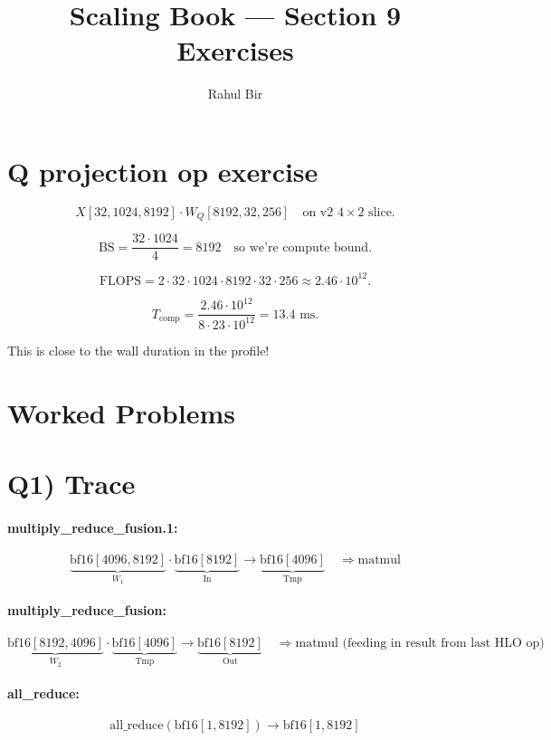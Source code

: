\documentclass[11pt]{article}
\title{Scaling Book --- Section 9 Exercises}
\author{Rahul Bir}
\date{}
\begin{document}
\maketitle

\section*{Q projection op exercise}

\[
X[32, 1024, 8192] \cdot W_Q[8192, 32, 256] \quad \text{on v2 } 4 \times 2 \text{ slice.}
\]

\[
\text{BS} = \frac{32 \cdot 1024}{4} = 8192 \quad \text{so we're compute bound.}
\]

\[
\text{FLOPS} = 2 \cdot 32 \cdot 1024 \cdot 8192 \cdot 32 \cdot 256 \approx 2.46 \cdot 10^{12}.
\]

\[
T_{\text{comp}} = \frac{2.46 \cdot 10^{12}}{8 \cdot 23 \cdot 10^{12}} = 13.4 \text{ ms.}
\]

This is close to the wall duration in the profile!

\section*{Worked Problems}

\section*{Q1) Trace}

\paragraph{multiply\_reduce\_fusion.1:}
\[
\underbrace{\text{bf16}[4096, 8192]}_{W_1} \cdot \underbrace{\text{bf16}[8192]}_{\text{In}} \to \underbrace{\text{bf16}[4096]}_{\text{Tmp}} \quad \Rightarrow \text{matmul}
\]

\paragraph{multiply\_reduce\_fusion:}
\[
\underbrace{\text{bf16}[8192, 4096]}_{W_2} \cdot \underbrace{\text{bf16}[4096]}_{\text{Tmp}} \to \underbrace{\text{bf16}[8192]}_{\text{Out}} \quad \Rightarrow \text{matmul (feeding in result from last HLO op)}
\]

\paragraph{all\_reduce:}
\[
\text{all\_reduce}(\text{bf16}[1, 8192]) \to \text{bf16}[1, 8192]
\]
\end{document}
